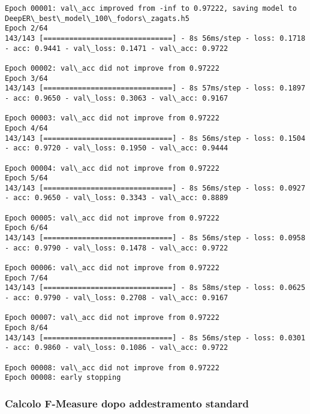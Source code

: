 \documentclass[11pt]{article}
\begin{document}
\begin{Verbatim}[commandchars=\\\{\}]
Epoch 00001: val\_acc improved from -inf to 0.97222, saving model to DeepER\_best\_model\_100\_fodors\_zagats.h5
Epoch 2/64
143/143 [==============================] - 8s 56ms/step - loss: 0.1718 - acc: 0.9441 - val\_loss: 0.1471 - val\_acc: 0.9722

Epoch 00002: val\_acc did not improve from 0.97222
Epoch 3/64
143/143 [==============================] - 8s 57ms/step - loss: 0.1897 - acc: 0.9650 - val\_loss: 0.3063 - val\_acc: 0.9167

Epoch 00003: val\_acc did not improve from 0.97222
Epoch 4/64
143/143 [==============================] - 8s 56ms/step - loss: 0.1504 - acc: 0.9720 - val\_loss: 0.1950 - val\_acc: 0.9444

Epoch 00004: val\_acc did not improve from 0.97222
Epoch 5/64
143/143 [==============================] - 8s 56ms/step - loss: 0.0927 - acc: 0.9650 - val\_loss: 0.3343 - val\_acc: 0.8889

Epoch 00005: val\_acc did not improve from 0.97222
Epoch 6/64
143/143 [==============================] - 8s 56ms/step - loss: 0.0958 - acc: 0.9790 - val\_loss: 0.1478 - val\_acc: 0.9722

Epoch 00006: val\_acc did not improve from 0.97222
Epoch 7/64
143/143 [==============================] - 8s 58ms/step - loss: 0.0625 - acc: 0.9790 - val\_loss: 0.2708 - val\_acc: 0.9167

Epoch 00007: val\_acc did not improve from 0.97222
Epoch 8/64
143/143 [==============================] - 8s 56ms/step - loss: 0.0301 - acc: 0.9860 - val\_loss: 0.1086 - val\_acc: 0.9722

Epoch 00008: val\_acc did not improve from 0.97222
Epoch 00008: early stopping

    \end{Verbatim}

    \subsubsection{Calcolo F-Measure dopo addestramento
standard}\label{calcolo-f-measure-dopo-addestramento-standard}
\end{document}

